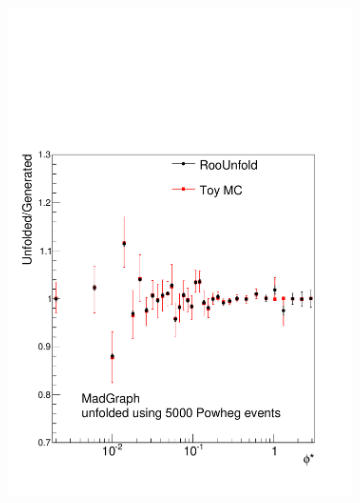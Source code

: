 \begin{figure}[!htbp]
    \centering
   \begin{subfigure}[b]{0.49\textwidth}
     \includegraphics[width=\linewidth]{figures/Unfolding/BinM_PM_5000.pdf}
     \caption{}
    \end{subfigure}
    \begin{subfigure}[b]{0.49\textwidth}

\end{subfigure}
\end{figure}
